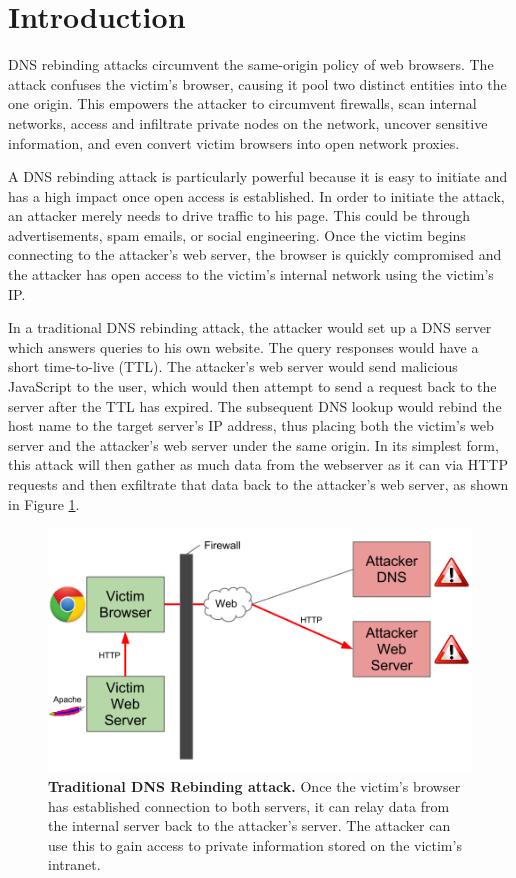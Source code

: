 \section{Introduction}
\label{sec:intro}


DNS rebinding attacks circumvent the same-origin policy of web browsers. The attack confuses the victim's browser, causing it pool two distinct entities into the one origin. This empowers the attacker to circumvent firewalls, scan internal networks, access and infiltrate private nodes on the network, uncover sensitive information, and even convert victim browsers into open network proxies.

A DNS rebinding attack is particularly powerful because it is easy to initiate and has a high impact once open access is established. In order to initiate the attack, an attacker merely needs to drive traffic to his page. This could be through advertisements, spam emails, or social engineering. Once the victim begins connecting to the attacker's web server, the browser is quickly compromised and the attacker has open access to the victim's internal network using the victim's IP.

In a traditional DNS rebinding attack, the attacker would set up a DNS server which answers queries to his own website. The query responses would have a short time-to-live (TTL). The attacker's web server would send malicious JavaScript to the user, which would then attempt to send a request back to the server after the TTL has expired. The subsequent DNS lookup would rebind the host name to the target server's IP address, thus placing both the victim's web server and the attacker's web server under the same origin. In its simplest form, this attack will then gather as much data from the webserver as it can via HTTP requests and then exfiltrate that data back to the attacker's web server, as shown in Figure \ref{fig:dnsrebind1}.

\begin{figure}[h]
\centering
\includegraphics[width=0.8\columnwidth]{dnsrebind1.png}
\caption{\textbf{Traditional DNS Rebinding attack.} Once the victim's browser has established connection to both servers, it can relay data from the internal server back to the attacker's server.  The attacker can use this to gain access to private information stored on the victim's intranet.}
\label{fig:dnsrebind1}
\end{figure}


